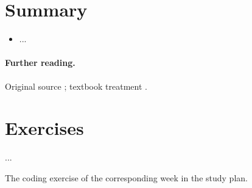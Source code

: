 \section{Summary}
\begin{summary}
\begin{itemize}
  \item ...
\end{itemize}
\end{summary}

\paragraph{Further reading.}
Original source \cite{key}; textbook treatment \cite{key}.

\section{Exercises}
\label{sec:chNN-exercises}
\begin{exercise}[\difficulty{1}]
\label{exr:chNN-slug}
...
\end{exercise}
\begin{exercise}
\label{exr:chNN-coding}
The coding exercise of the corresponding week in the study plan.
\end{exercise}
